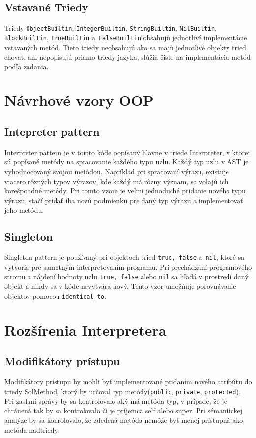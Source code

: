 \documentclass[a4paper, 11pt]{article}
\begin{document}
        \subsection{Vstavané Triedy}
        Triedy \texttt{ObjectBuiltin}, \texttt{IntegerBuiltin}, \texttt{StringBuiltin}, \texttt{NilBuiltin}, \texttt{BlockBuiltin}, \texttt{TrueBuiltin} a~\texttt{FalseBuiltin} obsahujú jednotlivé implementácie vstavaných metód.
        Tieto triedy neobsahujú ako sa majú jednotlivé objekty tried chovať, ani nepopisujú priamo triedy jazyka, slúžia čiste na implementáciu metód podľa zadania.

        \medskip

    \section{Návrhové vzory OOP}
        \subsection{Intepreter pattern}
        Interpreter pattern je v tomto kóde popísaný hlavne v triede Interpreter, v ktorej sú popísané metódy na spracovanie každého typu uzlu.
        Každý typ uzlu v AST je vyhodnocovaný svojou metódou. 
        Napríklad pri spracovaní výrazu, existuje viacero rôzných typov výrazov, kde každý má rôzny význam, sa volajú ich korešpondné metódy.
        Pri tomto vzore je veľmi jednoduché pridanie nového typu výrazu, stačí pridať iba novú podmienku pre daný typ výrazu a implementovať jeho metódu.
        
        \subsection{Singleton}
        Singleton pattern je používaný pri objektoch tried \texttt{true, false} a~\texttt{nil}, ktoré sa vytvoria pre samotným interpretovaním programu. 
        Pri prechádzaní programového stromu a nájdení hodnoty uzlu \texttt{true, false} alebo \texttt{nil} sa hľadá v prostredí daný objekt a nikdy sa v kóde nevytvára nový.
        Tento vzor umožňuje porovnávanie objektov pomocou \texttt{identical\_to}.

        \newpage

    \section{Rozšírenia Interpretera}
        \subsection{Modifikátory prístupu}
        Modifikátory prístupu by mohli byť implementované pridaním nového atribútu do triedy SolMethod, ktorý by určoval typ metódy(\texttt{public}, \texttt{private}, \texttt{protected}).
        Pri zaslaní správy by sa kontrolovalo aký má metóda typ, v prípade, že je chránená tak by sa kontrolovalo či je príjemca self alebo super.
        Pri sémantickej analýze by sa konrolovalo, že zdedená metóda nemôže byť menej prístupná ako metóda nadtriedy.
\end{document}
